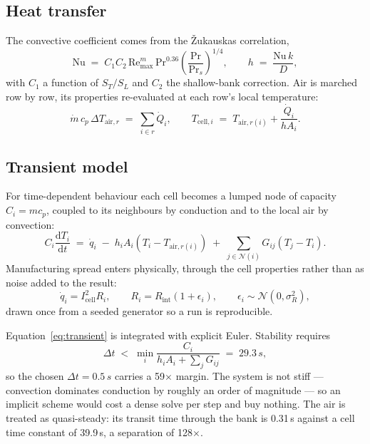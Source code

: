 \documentclass[11pt,a4paper]{article}
\newcommand{\qty}[2]{#1\,#2}
\begin{document}
\subsection{Heat transfer}

The convective coefficient comes from the Žukauskas correlation,
\begin{equation}
\mathrm{Nu} \;=\; C_1 C_2 \, \mathrm{Re}_{\max}^{m} \, \mathrm{Pr}^{0.36}
\left(\frac{\mathrm{Pr}}{\mathrm{Pr}_s}\right)^{1/4},
\qquad h \;=\; \frac{\mathrm{Nu}\,k}{D},
\label{eq:nu}
\end{equation}
with $C_1$ a function of $S_T/S_L$ and $C_2$ the shallow-bank correction. Air
is marched row by row, its properties re-evaluated at each row's local
temperature:
\begin{equation}
\dot m \, c_p \, \Delta T_{\mathrm{air},r} \;=\; \sum_{i \in r} \dot Q_i,
\qquad
T_{\mathrm{cell},i} \;=\; T_{\mathrm{air},r(i)} + \frac{\dot Q_i}{h A_i}.
\label{eq:march}
\end{equation}

\subsection{Transient model}

For time-dependent behaviour each cell becomes a lumped node of capacity
$C_i = m c_p$, coupled to its neighbours by conduction and to the local air by
convection:
\begin{equation}
C_i \frac{\mathrm{d}T_i}{\mathrm{d}t}
\;=\; \dot q_i
\;-\; h_i A_i \left(T_i - T_{\mathrm{air},r(i)}\right)
\;+\; \sum_{j \in \mathcal{N}(i)} G_{ij}\left(T_j - T_i\right).
\label{eq:transient}
\end{equation}
Manufacturing spread enters physically, through the cell properties rather than
as noise added to the result:
\begin{equation}
\dot q_i = I_{\mathrm{cell}}^{2} R_i,
\qquad R_i = R_{\mathrm{int}}\left(1 + \epsilon_i\right),
\qquad \epsilon_i \sim \mathcal{N}\!\left(0, \sigma_R^{2}\right),
\label{eq:scatter}
\end{equation}
drawn once from a seeded generator so a run is reproducible.

Equation~\eqref{eq:transient} is integrated with explicit Euler. Stability
requires
\begin{equation}
\Delta t \;<\; \min_i \frac{C_i}{h_i A_i + \sum_j G_{ij}} \;=\; \qty{29.3}{s},
\label{eq:cfl}
\end{equation}
so the chosen $\Delta t = \qty{0.5}{s}$ carries a 59$\times$ margin.
The system is not stiff --- convection dominates conduction by roughly an order
of magnitude --- so an implicit scheme would cost a dense solve per step and buy
nothing. The air is treated as quasi-steady: its transit time through the bank
is \qty{0.31}{s} against a cell time constant of \qty{39.9}{s}, a
separation of 128$\times$.
\end{document}
